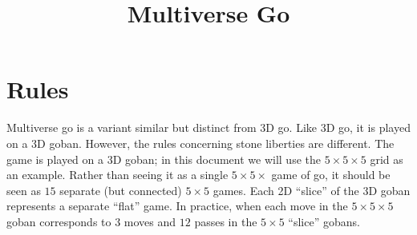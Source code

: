 \documentclass{article}
\title{Multiverse Go}
\date{}
\begin{document}
\maketitle

\newcommand\grid[1]{
  \pgfmathsetmacro\size{#1}
  \pgfmathsetmacro\sizemtwo{#1 - 2}

  \draw[ultra thick] (0,0) -- (0,\size - 1);
  \draw[ultra thick] (0,0) -- (\size - 1,0);
  \draw[ultra thick] (0,\size - 1) -- (\size - 1,\size - 1);
  \draw[ultra thick] (\size - 1,0) -- (\size - 1,\size - 1);

  \foreach \i in {1,...,\sizemtwo} {
    \draw (\i,0) -- (\i,\size - 1);
    \draw (0,\i) -- (\size - 1,\i);
  }
}

\newcommand\xlabels[2]{
  \foreach \label [count=\i] in #2 {
    \node at (\i-1,-0.5) {\texttt{\label}};
    \node at (\i-1,#1 -0.5) {\texttt{\label}};

    \ifnum \i=#1
      \breakforeach
    \fi
  }
}

\newcommand\ylabels[2]{
  \foreach \label [count=\i] in #2 {
    \node at (-0.5,\i-1) {\texttt{\label}};
    \node at (#1 -0.5,\i-1) {\texttt{\label}};

    \ifnum \i=#1
      \breakforeach
    \fi
  }
}

\newcommand\upperlabels{A,...,Z}
\newcommand\lowerlabels{do,re,mi,fa,so}
\newcommand\numberlabels{1,...,19}

\newcommand\upperboard[1]{
  \grid{#1}
  \xlabels{#1}{\numberlabels}
  \ylabels{#1}{\lowerlabels}
}

\newcommand\numberboard[1]{
  \grid{#1}
  \xlabels{#1}{\upperlabels}
  \ylabels{#1}{\lowerlabels}
}

\newcommand\lowerboard[1]{
  \grid{#1}
  \xlabels{#1}{\upperlabels}
  \ylabels{#1}{\numberlabels}
}

\section{Rules}

Multiverse go is a variant similar but distinct from 3D go.  Like 3D go, it is
played on a 3D goban.  However, the rules concerning stone liberties are
different.
%
The game is played on a 3D goban;  in this document we will use the $5\times
5\times 5$ grid as an example.  Rather than seeing it as a single $5 \times
5\times$ game of go, it should be seen as $15$ separate (but connected)
$5\times 5$ games.  Each 2D ``slice'' of the 3D goban represents a separate
``flat'' game.  In practice, when each move in the $5\times 5\times 5$ goban
corresponds to $3$ moves and $12$ passes in the $5\times 5$ ``slice'' gobans.
\end{document}

